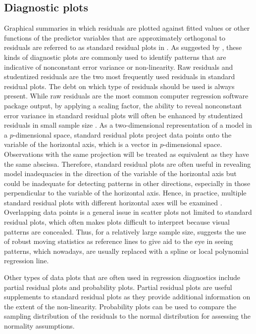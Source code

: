 \documentclass[]{interact}
\theoremstyle{plain}%
\theoremstyle{definition}
\theoremstyle{remark}
\begin{document}
\hypertarget{diagnostic-plots}{%
\subsection{Diagnostic plots}\label{diagnostic-plots}}

Graphical summaries in which residuals are plotted against fitted values
or other functions of the predictor variables that are approximately
orthogonal to residuals are referred to as standard residual plots in
\citet{cook1982residuals}. As suggested by \citet{cook1982residuals},
these kinds of diagnostic plots are commonly used to identify patterns
that are indicative of nonconstant error variance or non-linearity. Raw
residuals and studentized residuals are the two most frequently used
residuals in standard residual plots. The debt on which type of
residuals should be used is always present. While raw residuals are the
most common computer regression software package output, by applying a
scaling factor, the ability to reveal nonconstant error variance in
standard residual plots will often be enhanced by studentized residuals
in small sample size \citep{gunst2018regression}. As a two-dimensional
representation of a model in a \(p\)-dimensional space, standard
residual plots project data points onto the variable of the horizontal
axis, which is a vector in \(p\)-dimensional space. Observations with
the same projection will be treated as equivalent as they have the same
abscissa. Therefore, standard residual plots are often useful in
revealing model inadequacies in the direction of the variable of the
horizontal axis but could be inadequate for detecting patterns in other
directions, especially in those perpendicular to the variable of the
horizontal axis. Hence, in practice, multiple standard residual plots
with different horizontal axes will be examined
\citep{cook1982residuals}. Overlapping data points is a general issue in
scatter plots not limited to standard residual plots, which often makes
plots difficult to interpret because visual patterns are concealed.
Thus, for a relatively large sample size, \citet{cleveland1975graphical}
suggests the use of robust moving statistics as reference lines to give
aid to the eye in seeing patterns, which nowadays, are usually replaced
with a spline or local polynomial regression line.

Other types of data plots that are often used in regression diagnostics
include partial residual plots and probability plots. Partial residual
plots are useful supplements to standard residual plots as they provide
additional information on the extent of the non-linearity. Probability
plots can be used to compare the sampling distribution of the residuals
to the normal distribution for assessing the normality assumptions.
\end{document}
